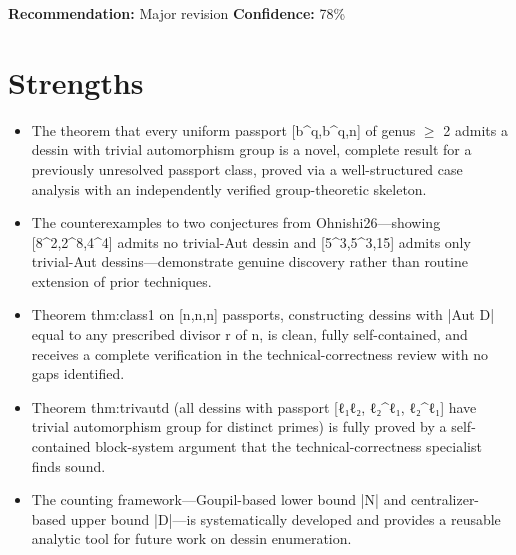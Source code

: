 \documentclass[11pt]{article}
\begin{document}
\textbf{Recommendation:} Major revision \quad \textbf{Confidence:} 78\%\\

\section*{Strengths}
\begin{itemize}[leftmargin=*]
  \item The theorem that every uniform passport [b\^{}q,b\^{}q,n] of genus \ensuremath{\ge} 2 admits a dessin with trivial automorphism group is a novel, complete result for a previously unresolved passport class, proved via a well-structured case analysis with an independently verified group-theoretic skeleton.
  \item The counterexamples to two conjectures from Ohnishi26---showing [8\^{}2,2\^{}8,4\^{}4] admits no trivial-Aut dessin and [5\^{}3,5\^{}3,15] admits only trivial-Aut dessins---demonstrate genuine discovery rather than routine extension of prior techniques.
  \item Theorem thm:class1 on [n,n,n] passports, constructing dessins with |Aut D| equal to any prescribed divisor r of n, is clean, fully self-contained, and receives a complete verification in the technical-correctness review with no gaps identified.
  \item Theorem thm:trivautd (all dessins with passport [ℓ₁ℓ₂, ℓ₂\^{}ℓ₁, ℓ₂\^{}ℓ₁] have trivial automorphism group for distinct primes) is fully proved by a self-contained block-system argument that the technical-correctness specialist finds sound.
  \item The counting framework---Goupil-based lower bound |N| and centralizer-based upper bound |D|---is systematically developed and provides a reusable analytic tool for future work on dessin enumeration.
\end{itemize}
\end{document}
